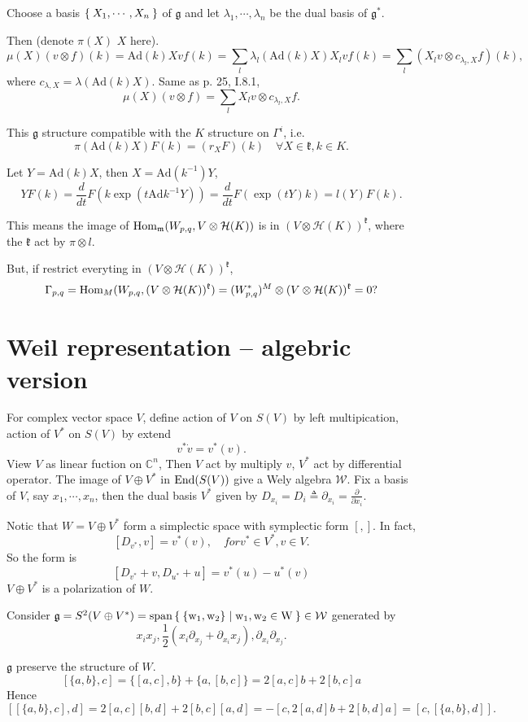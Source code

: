 \documentclass[12pt]{article}
\def\Hom{{\rm Hom}}
\def\End{{\rm End}}
\def\bC{{\mathbb{C}}}
\def\sspan{\rm{span}}
\def\Ad{{\rm Ad}}
\def\Ad{\mathrm{Ad}}
\def\fgg{\mathfrak{g}}
\def\fkk{\mathfrak{k}}
\def\chh{\mathcal{H}}
\def\cww{\mathcal{W}}
\def\fmm{\mathfrak{m}}
\begin{document}
Choose a basis $\Set{X_1, \cdots, X_n}$ of $\fgg$ and 
let $\lambda_1, \cdots,\lambda_n$ be the dual basis of $\fgg^*$.

Then (denote $\pi(X)$ $X$ here). 
\[
\mu(X) (v\otimes f)(k) = \Ad(k) X v f(k) = 
\sum_{l} \lambda_l(\Ad(k)X) X_l v f(k) 
= \sum_{l} (X_l v \otimes c_{\lambda_l,X} f)(k),
\]
where $c_{\lambda,X} = \lambda(\Ad(k)X)$.
Same as \cite{BorelWallach2000} p. 25, I.8.1,
\[
\mu(X) (v\otimes f) = \sum_l X_l v \otimes c_{\lambda_l,X} f. 
\]

This $\fgg$ structure compatible with the $K$ structure on $\Gamma^i$, i.e. 
\[
\pi(\Ad(k) X) F(k) = (r_X F)(k)\quad \forall X\in \fkk, k\in K.
\]

Let $Y=\Ad(k)X$, then $X = \Ad(k^{-1})Y$,
\[
YF(k) = \frac{d}{dt} F(k\exp(t\Ad k^{-1}Y))
= \frac{d}{dt} F(\exp(tY)k)
= l(Y)F (k). 
\]

This means the image of $\Hom_\fmm(W_{p,q},V\otimes \chh(K))$ is in 
$(V\otimes \chh(K))^\fkk$, where the $\fkk$ act by $\pi\otimes l$.

But, if restrict everyting in $(V\otimes \chh(K))^\fkk$, 
\[
\Gamma_{p,q} = \Hom_M(W_{p,q}, (V\otimes \chh(K))^\fkk)
=(W_{p,q}^*)^M \otimes (V\otimes \chh(K))^\fkk=0?
\] 


\section{Weil representation -- algebric version}
 For complex vector space $V$, define action of $V$ on $S(V)$
 by left multipication, action of $V^*$ on $S(V)$ by extend
\[
v^* \dot v = v^*(v).
\]
View $V$ as linear fuction on $\bC^n$, 
Then $V$ act by multiply $v$, 
$V^*$ act by differential operator. The image of $V\oplus V^*$
in $\End(S(V))$ give a Wely algebra $\cww$. 
Fix a basis of $V$, say $x_1, \cdots, x_n$, 
then the dual basis $V^*$ given by 
$D_{x_i} = D_i \triangleq \partial_{x_i}=  \frac{\partial}{\partial x_i}$.

Notic that $W=V\oplus V^*$ form a simplectic space 
 with symplectic form $[,]$.
In fact, 
\[
[D_{v^*},v] = v^*(v), \quad for v^*\in V^*, v\in V.
\] 
So the form is 
\[
[D_{v^*}+v,D_{u^*}+u] = v^*(u) - u^*(v)
\]
$V\oplus V^*$ is a polarization of $W$.

Consider $\fgg = S^2(V\oplus V^*) = \sspan\Set{\{w_1,w_2\}|w_1,w_2\in W}\in \cww$
generated by 
\[
x_ix_j, \frac{1}{2}(x_i \partial_{x_j} + \partial_{x_i} x_j), 
\partial_{x_i}\partial_{x_j}.
\]


$\fgg$ preserve the structure of $W$. 
\[
[\{a,b\},c] = \{[a,c],b\} + \{a,[b,c]\} = 2[a,c]b + 2[b,c]a
\]
Hence
\[
[[\{a,b\},c],d] = 2[a,c][b,d]+2[b,c][a,d] =  -[c,2[a,d]b+2[b,d]a]
=[c,[\{a,b\},d]].
\]
\end{document}

